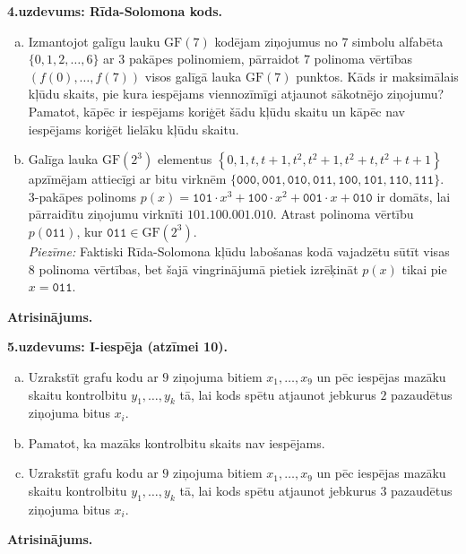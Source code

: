 \documentclass[11pt]{article}
\begin{document}
\vspace{10pt}
{\footnotesize
\noindent
{\bf 4.uzdevums: Rīda-Solomona kods.} 
\begin{enumerate}[(a)]
\item Izmantojot galīgu lauku $\text{GF}(7)$ kodējam ziņojumus no 
$7$ simbolu alfabēta $\{ 0,1,2,\ldots,6 \}$ ar $3$ pakāpes polinomiem, 
pārraidot $7$ polinoma vērtības $(f(0),\ldots,f(7))$ visos
galīgā lauka $\text{GF}(7)$ punktos. 
Kāds ir maksimālais kļūdu skaits, pie kura iespējams 
viennozīmīgi atjaunot sākotnējo ziņojumu?
Pamatot, kāpēc ir iespējams koriģēt šādu kļūdu skaitu un kāpēc nav
iespējams koriģēt lielāku kļūdu skaitu.
\item Galīga lauka $\text{GF}(2^3)$ elementus $\left\{ 0,1,t,t+1,t^2,t^2+1,t^2+t,t^2+t+1 \right\}$
apzīmējam attiecīgi ar bitu virknēm $\{\mathtt{000},\mathtt{001},\mathtt{010},\mathtt{011},
\mathtt{100},\mathtt{101},\mathtt{110},\mathtt{111}\}$.\\
$3$-pakāpes polinoms $p(x) = \mathtt{101}\cdot{}x^3 + \mathtt{100}\cdot{}x^2 + \mathtt{001}\cdot{}x + \mathtt{010}$
ir domāts, lai pārraidītu ziņojumu virknīti $\mathtt{101.100.001.010}$. 
Atrast polinoma vērtību $p(\mathtt{011})$, kur $\mathtt{011}\in\text{GF}(2^3)$.\\
{\em Piezīme:} Faktiski Rīda-Solomona kļūdu labošanas kodā vajadzētu sūtīt 
visas $8$ polinoma vērtības, bet šajā vingrinājumā pietiek izrēķināt $p(x)$ tikai pie $x=\mathtt{011}$. 
\end{enumerate}
}


\vspace{6pt}
{\bf Atrisinājums.} 


\vspace{10pt}
{\footnotesize
\noindent
{\bf 5.uzdevums:  I-iespēja (atzīmei 10).} 
\begin{enumerate}[(a)]
\item Uzrakstīt grafu kodu ar $9$ ziņojuma bitiem $x_1,\ldots,x_{9}$ 
un pēc iespējas mazāku skaitu kontrolbitu $y_1,\ldots,y_k$ tā, 
lai kods spētu atjaunot jebkurus $2$ pazaudētus ziņojuma bitus $x_i$.
\item Pamatot, ka mazāks kontrolbitu skaits nav iespējams.
\item Uzrakstīt grafu kodu ar $9$ ziņojuma bitiem $x_1,\ldots,x_{9}$ 
un pēc iespējas mazāku skaitu kontrolbitu $y_1,\ldots,y_k$ tā, 
lai kods spētu atjaunot jebkurus $3$ pazaudētus ziņojuma bitus $x_i$.
\end{enumerate}
}


\vspace{6pt}
{\bf Atrisinājums.} 
\end{document}
